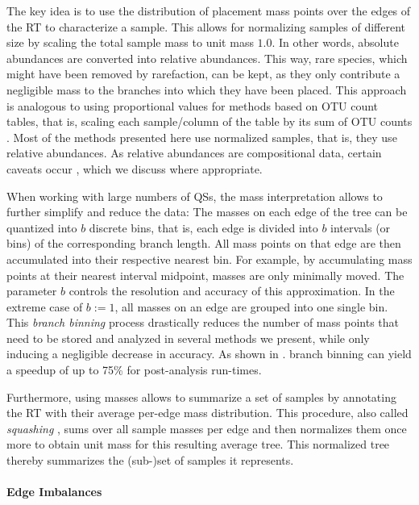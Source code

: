 The key idea is to use the distribution of placement mass points over the edges of the \ac{RT} to characterize a sample.
This allows for normalizing samples of different size
by scaling the total sample mass to unit mass $1.0$.
In other words, absolute abundances are converted into relative abundances.
This way, rare species, which might have been removed by rarefaction, can be kept,
as they only contribute a negligible mass to the branches into which they have been placed.
This approach is analogous to using proportional values for methods based on OTU count tables,
that is, scaling each sample/column of the table by its sum of OTU counts \cite{Weiss2017}.
Most of the methods presented here use normalized samples, that is, they use relative abundances.
As relative abundances are compositional data, certain caveats occur \cite{Aitchison1986,Lovell2015,Gloor2016},
which we discuss where appropriate.

When working with large numbers of \acp{QS},
the mass interpretation allows to further simplify and reduce the data:
The masses on each edge of the tree can be quantized into $b$ discrete bins,
that is, each edge is divided into $b$ intervals (or bins) of the corresponding branch length.
All mass points on that edge are then accumulated into their respective nearest bin.
For example, by accumulating mass points at their nearest interval midpoint, masses are only minimally moved.
The parameter $b$ controls the resolution and accuracy of this approximation.
In the extreme case of $b:=1$, all masses on an edge are grouped into one single bin.
This \emph{branch binning} process drastically reduces the number of mass points
that need to be stored and analyzed in several methods we present,
while only inducing a negligible decrease in accuracy.
As shown in .
branch binning can yield a speedup of up to 75\% for post-analysis run-times.

Furthermore, using masses allows to summarize a set of samples
by annotating the \ac{RT} with their average per-edge mass distribution.
This procedure, also called \emph{squashing} \cite{Matsen2011a}, sums over all sample masses per edge
and then normalizes them once more to obtain unit mass for this resulting average tree.
This normalized tree thereby summarizes the (sub-)set of samples it represents.

\paragraph{Edge Imbalances}
\label{ch:Foundations:sec:PhylogeneticPlacement:sub:PlacementProcessing:par:EdgeImbalances}

